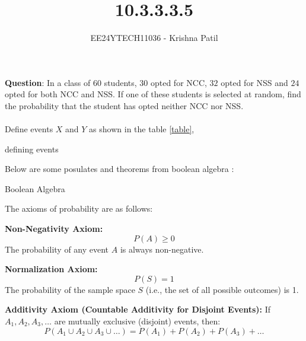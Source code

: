 \documentclass[journal]{IEEEtran}
\begin{document}

\vspace{3cm}

\title{10.3.3.3.5}
\author{EE24YTECH11036 - Krishna Patil}
{\let\newpage\relax\maketitle}
\renewcommand{\thefigure}{\theenumi}
\renewcommand{\thetable}{\theenumi}
\setlength{\intextsep}{10pt} %


\textbf{Question}: In a class of $60$ students, $30$ opted for NCC, $32$ opted for NSS and $24$ opted for both NCC and NSS. If one of these students is selected at random, find the probability that the student has opted neither NCC nor NSS. \\ \\
\solution
Define events $X$ and $Y$ as shown in the table \ref{table}, \\
\begin{table}[h!]    
  \centering
  
  \caption{defining events}
  \label{table}
\end{table}
\newline Below are some posulates and theorems from boolean algebra : 
\begin{table}[h!]    
  \centering
  
  \caption{Boolean Algebra}
  \label{table2}
\end{table}
\newline The axioms of probability are as follows:

\textbf{Non-Negativity Axiom:}
\[
P(A) \geq 0
\]
The probability of any event \( A \) is always non-negative.

\textbf{Normalization Axiom:}
\[
P(S) = 1
\]
The probability of the sample space \( S \) (i.e., the set of all possible outcomes) is 1.

\textbf{Additivity Axiom (Countable Additivity for Disjoint Events):}  
If \( A_1, A_2, A_3, \dots \) are mutually exclusive (disjoint) events, then:
\[
P(A_1 \cup A_2 \cup A_3 \cup \dots) = P(A_1) + P(A_2) + P(A_3) + \dots
\]
\end{document}
